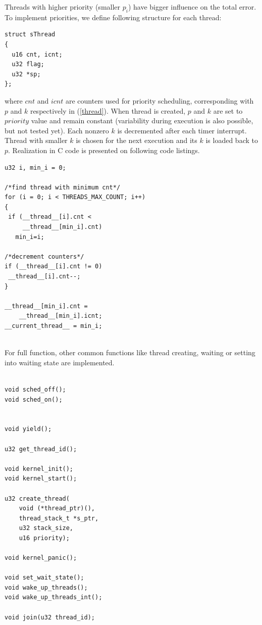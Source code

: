 \documentclass[a4paper, conference]{IEEEtran}
\begin{document}
Threads with higher priority (smaller $p_i$) have bigger influence on the total error. To implement priorities, we define following structure for each thread:
\noindent\begin{minipage}{.45\textwidth}
\lstset{language=C++}
\begin{lstlisting}[frame=single, caption = thread structure]
struct sThread
{
  u16 cnt, icnt;
  u32 flag;
  u32 *sp;
};
\end{lstlisting}
\end{minipage}\hfill
where $cnt$ and $icnt$ are counters used for priority scheduling, corresponding with $p$ and $k$ respectively in (\ref{thread}).
When thread is created, $p$ and $k$ are set to $priority$ value and remain constant (variability during execution is also possible, but not tested yet).
Each nonzero $k$ is decremented after each timer interrupt. Thread with smaller $k$ is chosen for the next execution and its $k$ is loaded back to $p$.
Realization in C code is presented on following code listings.
\noindent
\begin{minipage}{.45\textwidth}
\lstset{language=C++}
\begin{lstlisting}[frame=single, caption = priority scheduler]
u32 i, min_i = 0;

/*find thread with minimum cnt*/
for (i = 0; i < THREADS_MAX_COUNT; i++)
{
 if (__thread__[i].cnt <
     __thread__[min_i].cnt)
   min_i=i;

/*decrement counters*/
if (__thread__[i].cnt != 0)
 __thread__[i].cnt--;
}

__thread__[min_i].cnt =
	__thread__[min_i].icnt;
__current_thread__ = min_i;
\end{lstlisting}
\end{minipage}
\\
For full function, other common functions like thread creating, waiting or setting into waiting state are implemented.
\noindent\begin{minipage}{.45\textwidth}
\lstset{language=C++}
\begin{lstlisting}[frame=single, caption = kernel functions]

void sched_off();
void sched_on();


void yield();

u32 get_thread_id();

void kernel_init();
void kernel_start();

u32 create_thread(
	void (*thread_ptr)(),
	thread_stack_t *s_ptr,
	u32 stack_size,
	u16 priority);

void kernel_panic();

void set_wait_state();
void wake_up_threads();
void wake_up_threads_int();

void join(u32 thread_id);

\end{lstlisting}
\end{minipage}\hfill
\end{document}
